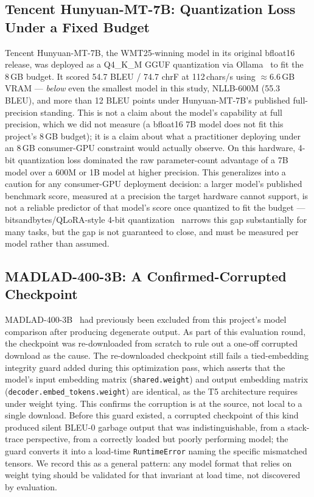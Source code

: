 \documentclass[conference]{IEEEtran}
\newcommand{\NLLBBLEU}{55.3}
\newcommand{\HUNYUANBLEU}{54.7}
\newcommand{\HUNYUANCHRF}{74.7}
\newcommand{\HUNYUANCHS}{112}
\newcommand{\HUNYUANVRAM}{$\approx$6.6\,GB}
\begin{document}
\subsection{Tencent Hunyuan-MT-7B: Quantization Loss Under a Fixed Budget}

Tencent Hunyuan-MT-7B, the WMT25-winning model in its original
bfloat16 release, was deployed as a Q4\_K\_M GGUF quantization via
Ollama~\cite{ollama2024} to fit the 8\,GB budget. It scored
\HUNYUANBLEU{} BLEU / \HUNYUANCHRF{} chrF at \HUNYUANCHS{}\,chars/s using
\HUNYUANVRAM{} VRAM --- \emph{below} even the smallest model in this
study, NLLB-600M (\NLLBBLEU{} BLEU), and more than 12 BLEU points under
Hunyuan-MT-7B's published full-precision standing. This is not a claim
about the model's capability at full precision, which we did not measure
(a bfloat16 7B model does not fit this project's 8\,GB budget); it is a
claim about what a practitioner deploying under an 8\,GB consumer-GPU
constraint would actually observe. On this hardware, 4-bit quantization
loss dominated the raw parameter-count advantage of a 7B model over a
600M or 1B model at higher precision. This generalizes into a caution for
any consumer-GPU deployment decision: a larger model's published
benchmark score, measured at a precision the target hardware cannot
support, is not a reliable predictor of that model's score once quantized
to fit the budget --- bitsandbytes/QLoRA-style
4-bit quantization~\cite{dettmers2023qlora} narrows this gap
substantially for many tasks, but the gap is not guaranteed to close, and
must be measured per model rather than assumed.

\subsection{MADLAD-400-3B: A Confirmed-Corrupted Checkpoint}

MADLAD-400-3B~\cite{kudugunta2023madlad} had previously been excluded from
this project's model comparison after producing degenerate output. As
part of this evaluation round, the checkpoint was re-downloaded from
scratch to rule out a one-off corrupted download as the cause. The
re-downloaded checkpoint still fails a tied-embedding integrity guard
added during this optimization pass, which asserts that the model's
input embedding matrix (\texttt{shared.weight}) and output embedding
matrix (\texttt{decoder.embed\_tokens.weight}) are identical, as the T5
architecture requires under weight tying. This confirms the corruption is
at the source, not local to a single download. Before this guard existed,
a corrupted checkpoint of this kind produced silent BLEU-0 garbage output
that was indistinguishable, from a stack-trace perspective, from a
correctly loaded but poorly performing model; the guard converts it into
a load-time \texttt{RuntimeError} naming the specific mismatched tensors.
We record this as a general pattern: any model format that relies on
weight tying should be validated for that invariant at load time, not
discovered by evaluation.
\end{document}
